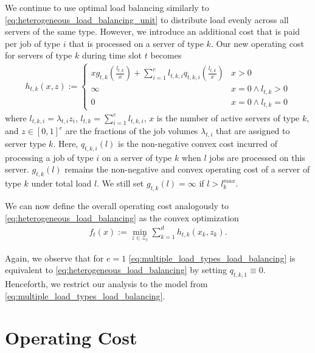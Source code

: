 We continue to use optimal load balancing similarly to \autoref{eq:heterogeneous_load_balancing_unit} to distribute load evenly across all servers of the same type. However, we introduce an additional cost that is paid per job of type $i$ that is processed on a server of type $k$. Our new operating cost for servers of type $k$ during time slot $t$ becomes \begin{align}\label{eq:multiple_load_types_load_balancing_unit}
    h_{t,k}(x,z) := \begin{cases}
        x g_{t,k}\left(\frac{l_{t,k}}{x}\right) + \sum_{i=1}^e l_{t,k,i} q_{t,k,i}\left(\frac{l_{t,k}}{x}\right) & x > 0 \\
        \infty                                                                                                   & x = 0 \land l_{t,k} > 0 \\
        0                                                                                                        & x = 0 \land l_{t,k} = 0
    \end{cases}
\end{align} where $l_{t,k,i} = \lambda_{t,i} z_i$, $l_{t,k} = \sum_{i=1}^e l_{t,k,i}$, $x$ is the number of active servers of type $k$, and $z \in [0,1]^e$ are the fractions of the job volumes $\lambda_{t,i}$ that are assigned to server type $k$. Here, $q_{t,k,i}(l)$ is the non-negative convex cost incurred of processing a job of type $i$ on a server of type $k$ when $l$ jobs are processed on this server. $g_{t,k}(l)$ remains the non-negative and convex operating cost of a server of type $k$ under total load $l$. We still set $g_{t,k}(l) = \infty$ if $l > l_k^{max}$.

We can now define the overall operating cost analogously to \autoref{eq:heterogeneous_load_balancing} as the convex optimization \begin{align}\label{eq:multiple_load_types_load_balancing}
    f_t(x) := \min_{z \in \mathcal{Z}_t} \sum_{k=1}^d h_{t,k}(x_k,z_k).
\end{align}

Again, we observe that for $e = 1$ \autoref{eq:multiple_load_types_load_balancing} is equivalent to \autoref{eq:heterogeneous_load_balancing} by setting $q_{t,k,1} \equiv 0$. Henceforth, we restrict our analysis to the model from \autoref{eq:multiple_load_types_load_balancing}.

\section{Operating Cost}\label{section:application:operating_cost}

